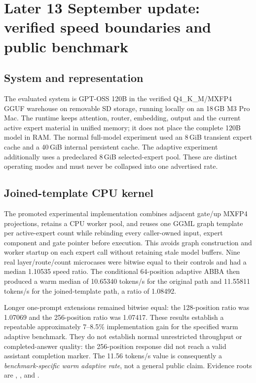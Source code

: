 \section{Later 13 September update: verified speed boundaries and public benchmark}
\label{sec:gptoss-speed-later-20260913}

\subsection{System and representation}
The evaluated system is GPT-OSS 120B in the verified Q4\_K\_M/MXFP4 GGUF
warehouse on removable SD storage, running locally on an 18\,GB M3 Pro Mac.
The runtime keeps attention, router, embedding, output and the current active
expert material in unified memory; it does not place the complete 120B model
in RAM. The normal full-model experiment used an 8\,GiB transient expert cache
and a 40\,GiB internal persistent cache. The adaptive experiment additionally
uses a predeclared 8\,GiB selected-expert pool. These are distinct operating
modes and must never be collapsed into one advertised rate.

\subsection{Joined-template CPU kernel}
The promoted experimental implementation combines adjacent gate/up MXFP4
projections, retains a CPU worker pool, and reuses one GGML graph template per
active-expert count while rebinding every caller-owned input, expert component
and gate pointer before execution. This avoids graph construction and worker
startup on each expert call without retaining stale model buffers. Nine
real layer/route/count microcases were bitwise equal to their controls and
had a median 1.10535 speed ratio. The conditional 64-position adaptive ABBA
then produced a warm median of 10.65340 tokens/s for the original path and
11.55811 tokens/s for the joined-template path, a ratio of 1.08492.

Longer one-prompt extensions remained bitwise equal: the 128-position ratio
was 1.07069 and the 256-position ratio was 1.07417. These results establish
a repeatable approximately 7--8.5\% implementation gain for the specified
warm adaptive benchmark. They do not establish normal unrestricted throughput
or completed-answer quality: the 256-position response did not reach a valid
assistant completion marker. The 11.56 tokens/s value is consequently a
\emph{benchmark-specific warm adaptive rate}, not a general public claim.
Evidence roots are
,
, and
.

